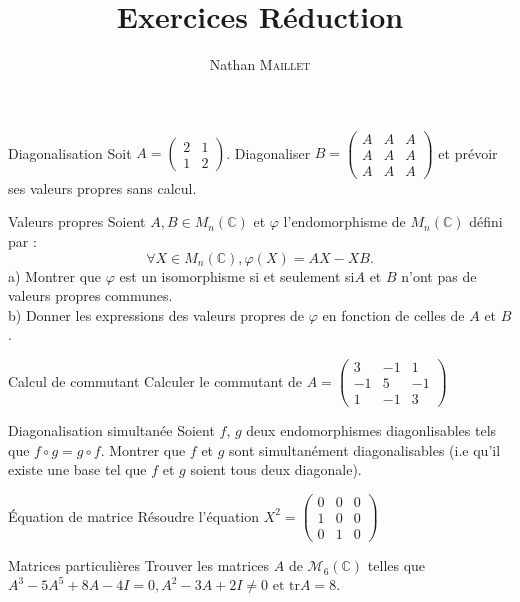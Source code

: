 \documentclass[french, a4paper, 11pt]{article}
\title{Exercices Réduction}
\author{Nathan \textsc{Maillet}}
\date{}
\newcommand{\ssi}{si et seulement si\xspace}		%
\newcommand{\C}{\mathbb{C}}   %
\newcommand{\po}{\left(}         %
\newcommand{\pf}{\right)}        %
\newcommand{\pof}[1]{\po #1 \pf} %
\begin{document}
\maketitle
\begin{cadre}{Diagonalisation}
    Soit \(A=\begin{pmatrix} 2 & 1 \\ 1 & 2 \end{pmatrix}\). Diagonaliser \(B=\begin{pmatrix}
        A & A & A \\
        A & A & A \\
        A & A & A
    \end{pmatrix}\) et prévoir ses valeurs propres sans calcul.
\end{cadre}

\begin{cadre}{Valeurs propres}
    Soient \(A,B \in M_n(\C)\) et \(\varphi\) l'endomorphisme de \(M_n(\C)\) défini par : 
        \[\forall X \in M_n(\C), \varphi(X)=AX-XB.\]
    a) Montrer que $\varphi$ est un isomorphisme \ssi $A$ et $B$ n'ont pas de valeurs propres communes.\\
    b) Donner les expressions des valeurs propres de $\varphi$ en fonction de celles de $A$ et $B$.
\end{cadre}

\begin{cadre}{Calcul de commutant}
    Calculer le commutant de \(A=\begin{pmatrix}
        3 & -1 & 1\\
        -1 & 5 & -1\\
        1 & -1 & 3
    \end{pmatrix}\)
\end{cadre}
 
\begin{cadre}{Diagonalisation simultanée}
    Soient \(f\), \(g\) deux endomorphismes diagonlisables tels que \(f\circ g=g\circ f\). Montrer que \(f\) et \(g\)
    sont simultanément diagonalisables (i.e qu'il existe une base tel que \(f\) et \(g\) soient tous deux diagonale).
\end{cadre}

\begin{cadre}{Équation de matrice}
    Résoudre l'équation \(X^2=\begin{pmatrix}
        0 & 0 & 0\\
        1 & 0 & 0\\
        0 & 1 & 0
    \end{pmatrix}\)
\end{cadre}

\begin{cadre}{Matrices particulières}
    Trouver les matrices $A$ de $\mathcal{M}_6\pof{\C}$ telles que
    \(A^3-5A^5+8A-4I=0, A^2-3A+2I \neq 0 \text{ et tr}A=8.\)
\end{cadre}
\end{document}
